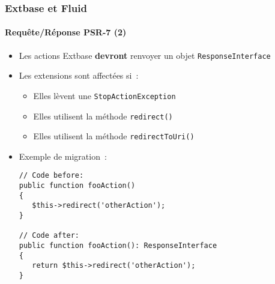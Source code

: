 %

\begin{frame}[fragile]
	\frametitle{Extbase et Fluid}
	\framesubtitle{Requête/Réponse PSR-7 (2)}


	\begin{itemize}
		\item Les actions Extbase \textbf{devront} renvoyer un objet \texttt{ResponseInterface}
		\item Les extensions sont affectées si~:
			\begin{itemize}
				\item Elles lèvent une \texttt{StopActionException}
				\item Elles utilisent la méthode \texttt{redirect()}
				\item Elles utilisent la méthode \texttt{redirectToUri()}
			\end{itemize}
		\item Exemple de migration~:
\begin{lstlisting}
// Code before:
public function fooAction()
{
   $this->redirect('otherAction');
}

// Code after:
public function fooAction(): ResponseInterface
{
   return $this->redirect('otherAction');
}
\end{lstlisting}

	\end{itemize}

\end{frame}

